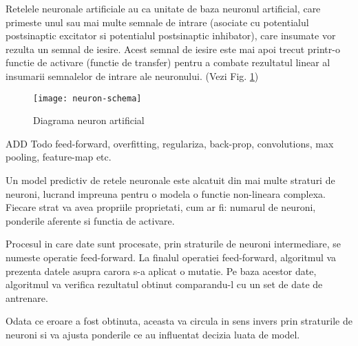	
	Retelele neuronale artificiale au ca unitate de baza neuronul artificial, care primeste unul sau mai multe semnale de intrare (asociate cu potentialul postsinaptic excitator si potentialul postsinaptic inhibator), care insumate vor rezulta un semnal de iesire. Acest semnal de iesire este mai apoi trecut printr-o functie de activare (functie de transfer) pentru a combate rezultatul linear al insumarii semnalelor de intrare ale neuronului. (Vezi Fig. \ref{fig:neuron-schema})
	
	\begin{figure}[H]
		\texttt{[image: neuron-schema]}  
		\caption{\label{fig:neuron-schema} Diagrama neuron artificial 
		\protect 
		\footnotemark}
	\end{figure}
	
	
	
	ADD Todo feed-forward, overfitting, regulariza, back-prop, convolutions, max pooling, feature-map etc.
	
	Un model predictiv de retele neuronale este alcatuit din mai multe straturi de neuroni, lucrand impreuna pentru o modela o functie non-lineara complexa.
	Fiecare strat va avea propriile proprietati, cum ar fi: numarul de neuroni, ponderile aferente si functia de activare.
	
	Procesul in care date sunt procesate, prin straturile de neuroni intermediare, se numeste operatie feed-forward. La finalul operatiei feed-forward, algoritmul va prezenta datele asupra carora s-a aplicat o mutatie. Pe baza acestor date, algoritmul va verifica rezultatul obtinut comparandu-l cu un set de date de antrenare. 
	
	Odata ce eroare a fost obtinuta, aceasta va circula in sens invers prin straturile de neuroni si va ajusta ponderile ce au influentat decizia luata de model.
	
	

